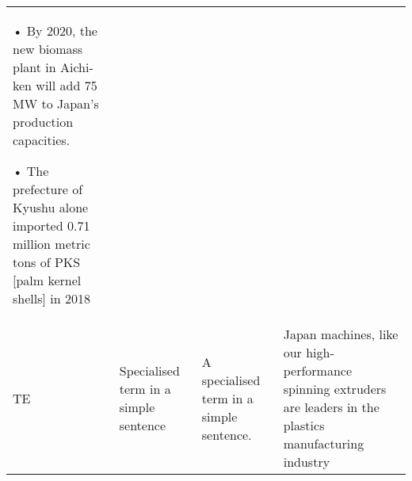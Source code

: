 \begin{sidewaystable}
\begin{tabularx}{\textwidth}{l>{\raggedright\arraybackslash}p{}QQ}
•   By 2020, the new biomass plant in Aichi-ken will add 75 MW to Japan's production capacities.

•  The prefecture of Kyushu alone imported 0.71 million metric tons of PKS {[}palm kernel shells{]} in 2018                                                                                                                                        \\ \tablevspace

TE                   & Specialised term in a simple sentence                               & A specialised term in a simple sentence.                                                                                                                                                                                                                                                                                                                                                                                                                    & Japan machines, like our high-performance spinning extruders are leaders in the plastics manufacturing industry                                                                                                                                                                                                                                                                                                                                                                    \\ 

\midrule





\end{tabularx}
\end{sidewaystable}






